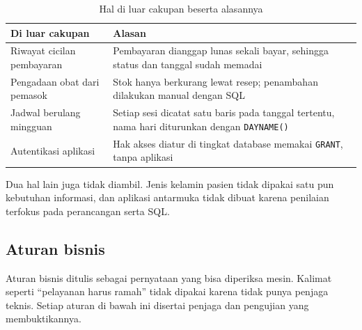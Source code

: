 \documentclass[12pt,a4paper]{article}
\begin{document}
\begin{table}[ht]
\centering
\caption{Hal di luar cakupan beserta alasannya}
\small
\begin{tabularx}{\textwidth}{@{}p{4.2cm}X@{}}
\toprule
\textbf{Di luar cakupan} & \textbf{Alasan} \\
\midrule
Riwayat cicilan pembayaran & Pembayaran dianggap lunas sekali bayar, sehingga status dan tanggal sudah memadai \\
Pengadaan obat dari pemasok & Stok hanya berkurang lewat resep; penambahan dilakukan manual dengan SQL \\
Jadwal berulang mingguan & Setiap sesi dicatat satu baris pada tanggal tertentu, nama hari diturunkan dengan \texttt{DAYNAME()} \\
Autentikasi aplikasi & Hak akses diatur di tingkat database memakai \texttt{GRANT}, tanpa aplikasi \\
\bottomrule
\end{tabularx}
\end{table}

Dua hal lain juga tidak diambil. Jenis kelamin pasien tidak dipakai satu pun
kebutuhan informasi, dan aplikasi antarmuka tidak dibuat karena penilaian
terfokus pada perancangan serta SQL.

\subsection{Aturan bisnis}

Aturan bisnis ditulis sebagai pernyataan yang bisa diperiksa mesin. Kalimat
seperti ``pelayanan harus ramah'' tidak dipakai karena tidak punya penjaga
teknis. Setiap aturan di bawah ini disertai penjaga dan pengujian yang
membuktikannya.
\end{document}
